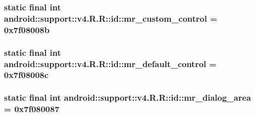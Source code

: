 \hypertarget{classandroid_1_1support_1_1v4_1_1_r_1_1id_efaf24fd497260d314857ec170f1c476}{
\subsubsection[{mr\_\-custom\_\-control}]{\setlength{\rightskip}{0pt plus 5cm}static final int android::support::v4.R.R::id::mr\_\-custom\_\-control = 0x7f08008b}}
\label{classandroid_1_1support_1_1v4_1_1_r_1_1id_efaf24fd497260d314857ec170f1c476}


\hypertarget{classandroid_1_1support_1_1v4_1_1_r_1_1id_dde082062b9885a830e8be828bbc13ac}{
\subsubsection[{mr\_\-default\_\-control}]{\setlength{\rightskip}{0pt plus 5cm}static final int android::support::v4.R.R::id::mr\_\-default\_\-control = 0x7f08008c}}
\label{classandroid_1_1support_1_1v4_1_1_r_1_1id_dde082062b9885a830e8be828bbc13ac}


\hypertarget{classandroid_1_1support_1_1v4_1_1_r_1_1id_a4fc8171f10ff9e59e67c9abfe087d9d}{
\subsubsection[{mr\_\-dialog\_\-area}]{\setlength{\rightskip}{0pt plus 5cm}static final int android::support::v4.R.R::id::mr\_\-dialog\_\-area = 0x7f080087}}
\label{classandroid_1_1support_1_1v4_1_1_r_1_1id_a4fc8171f10ff9e59e67c9abfe087d9d}


